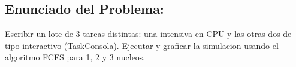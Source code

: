 \subsection{Enunciado del Problema:}

Escribir un lote de 3 tareas distintas: una intensiva en CPU y las otras dos de tipo interactivo (TaskConsola). Ejecutar y graficar la simulacion usando el algoritmo FCFS para 1, 2 y 3 nucleos.
